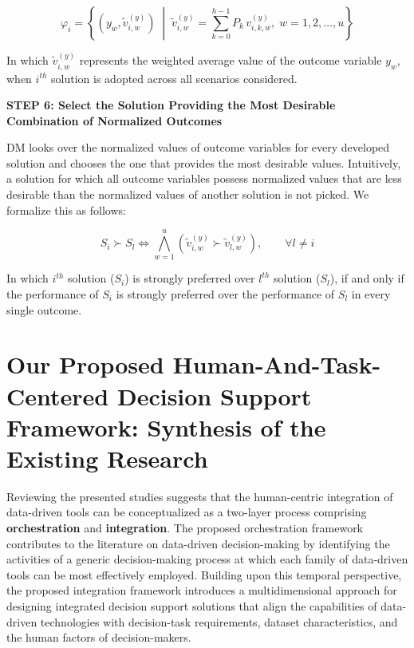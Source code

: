 \documentclass{sfuthesis}
\begin{document}
\begin{equation}
\varphi_i
=
\left\{
(y_w,\tilde{v}_{i,w}^{(y)})
\;\middle|\;
\tilde{v}_{i,w}^{(y)}
=
\sum_{k=0}^{h-1}
P_k\,v_{i,k,w}^{(y)},
\;
w=1,2,\ldots,u
\right\}
\end{equation}

In which $\tilde{v}_{i,w}^{(y)}$ represents the weighted average value of the outcome variable $y_w$, when $i^{th}$ solution is adopted across all scenarios considered.

\textbf{STEP 6: Select the Solution Providing the Most Desirable Combination of
Normalized Outcomes}

DM looks over the normalized values of outcome variables for every developed solution
and chooses the one that provides the most desirable values. Intuitively, a solution for which all outcome variables possess normalized values that are less desirable than the normalized values of another solution is not picked. We formalize this as follows:

\begin{equation}
S_i \succ S_l
\iff
\bigwedge_{w=1}^{u}
\left(
\tilde{v}_{i,w}^{(y)}
\succ
\tilde{v}_{l,w}^{(y)}
\right),
\qquad
\forall l\neq i
\end{equation}

In which $i^{th}$ solution ($S_i$) is strongly preferred over $l^{th}$ solution ($S_l$), if and only if the performance of $S_i$ is strongly preferred over the performance of $S_l$ in every single outcome. 


\section{Our Proposed Human-And-Task-Centered Decision Support Framework: Synthesis of the Existing Research}
Reviewing the presented studies suggests that the human-centric integration of data-driven tools can be conceptualized as a two-layer process comprising \textbf{orchestration} and \textbf{integration}. The proposed orchestration framework contributes to the literature on data-driven decision-making by identifying the activities of a generic decision-making process at which each family of data-driven tools can be most effectively employed. Building upon this temporal perspective, the proposed integration framework introduces a multidimensional approach for designing integrated decision support solutions that align the capabilities of data-driven technologies with decision-task requirements, dataset characteristics, and the human factors of decision-makers.
\end{document}
